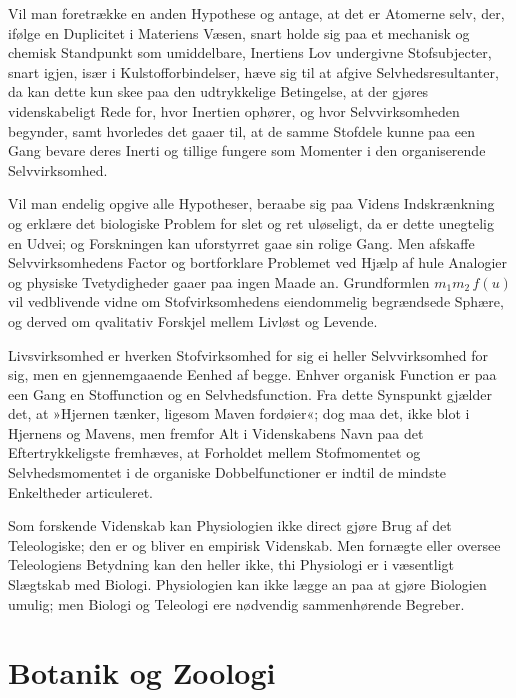 \documentclass[12pt]{book}
\newcommand{\apage}[1]{\marginnote{\footnotesize\textit{[#1]}}}
\begin{document}
Vil man foretrække en anden Hypothese og antage, at det er Atomerne selv,
der, ifølge en Duplicitet i Materiens Væsen, snart holde sig paa et
mechanisk og chemisk Standpunkt som umiddelbare, Inertiens Lov undergivne
Stofsubjecter, snart igjen, især i Kulstofforbindelser, hæve sig til at
afgive Selvhedsresultanter, da kan dette kun skee paa den udtrykkelige
Betingelse, at der gjøres videnskabeligt Rede for, hvor Inertien ophører,
og hvor Selvvirksomheden begynder, samt hvorledes det gaaer til, at de
samme Stofdele kunne paa een Gang bevare deres Inerti og tillige fungere
som Momenter i den organiserende Selvvirksomhed.

\apage{183} Vil man endelig opgive alle Hypotheser, beraabe sig paa Videns
Indskrænkning og erklære det biologiske Problem for slet og ret uløseligt,
da er dette unegtelig en Udvei; og Forskningen kan uforstyrret gaae sin
rolige Gang. Men afskaffe Selvvirksomhedens Factor og bortforklare
Problemet ved Hjælp af hule Analogier og physiske Tvetydigheder gaaer paa
ingen Maade an. Grundformlen $m_1 m_2\, f(u)$ vil vedblivende vidne om
Stofvirksomhedens eiendommelig begrændsede Sphære, og derved om qvalitativ
Forskjel mellem Livløst og Levende.

Livsvirksomhed er hverken Stofvirksomhed for sig ei heller Selvvirksomhed
for sig, men en gjennemgaaende Eenhed af begge. Enhver organisk Function er
paa een Gang en Stoffunction og en Selvhedsfunction. Fra dette Synspunkt
gjælder det, at »Hjernen tænker, ligesom Maven fordøier«; dog maa det, ikke
blot i Hjernens og Mavens, men fremfor Alt i Videnskabens Navn paa det
Eftertrykkeligste fremhæves, at Forholdet mellem Stofmomentet og
Selvhedsmomentet i de organiske Dobbelfunctioner er indtil de mindste
Enkeltheder articuleret.

Som forskende Videnskab kan Physiologien ikke direct gjøre Brug af det
Teleologiske; den er og bliver en empirisk Videnskab. Men fornægte eller
oversee Teleologiens Betydning kan den heller ikke, thi Physiologi er i
væsentligt Slægtskab med Biologi. Physiologien kan ikke lægge an paa at
gjøre Biologien umulig; men Biologi og Teleologi ere nødvendig
sammenhørende Begreber.

\section{Botanik og Zoologi} \apage{184} 
\label{sec:18}
\end{document}
